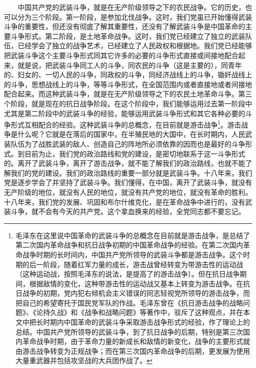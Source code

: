 \documentclass[cn,11pt,chinese]{elegantbook}
\begin{document}
　　中国共产党的武装斗争，就是在无产阶级领导之下的农民战争。它的历史，也可以分为三个阶段。第一阶段，是参加北伐战争。这时，我们党虽已开始懂得武装斗争的重要性，但还没有彻底了解其重要性，还没有了解武装斗争是中国革命的主要斗争形式。第二阶段，是土地革命战争。这时，我们党已经建立了独立的武装队伍，已经学会了独立的战争艺术，已经建立了人民政权和根据地。我们党已经能够把武装斗争这个主要斗争形式同其它许多的必要的斗争形式直接或间接地配合起来，就是说，把武装斗争同工人的斗争，同农民的斗争（这是主要的），同青年的、妇女的、一切人民的斗争，同政权的斗争，同经济战线上的斗争，锄奸战线上的斗争，思想战线上的斗争，等等斗争形式，在全国范围内或者直接地或者间接地配合起来。而这种武装斗争，就是在无产阶级领导之下的农民土地革命斗争。第三个阶段，就是现在的抗日战争阶段。在这个阶段中，我们能够运用过去第一阶段中尤其是第二阶段中的武装斗争的经验，能够运用武装斗争形式和其它各种必要的斗争形式互相配合的经验。这种武装斗争的总概念，在目前就是游击战争\footnote[3]{ 毛泽东在这里说中国革命的武装斗争的总概念在目前就是游击战争，是总结了第二次国内革命战争和抗日战争初期的中国革命战争的经验。在第二次国内革命战争时期的长时间内，中国共产党所领导的武装斗争都是游击战争。这个时期的后一阶段，随着红军力量的成长，游击战曾经转变为带游击性的运动战（这种运动战，按照毛泽东的说法，是提高了的游击战争）。但在抗日战争期间，根据敌情的变化，这种带游击性的运动战又基本上转变为游击战争。在抗日战争的初期，党内犯右倾机会主义错误的同志轻视党所领导的游击战争，而把自己的希望寄托于国民党军队的作战。毛泽东曾在《抗日游击战争的战略问题》、《论持久战》和《战争和战略问题》等著作中，驳斥了这种观点，并在本文中把长时期内中国革命的武装斗争采取游击战争形式的经验，作了理论上的总结。中国共产党所领导的武装斗争，到了抗日战争的后期，特别是第三次国内革命战争时期，由于革命力量的新成长和敌情的新变化，战争的主要形式就由游击战争转变为正规战争；而在第三次国内革命战争的后期，更发展为使用大量重武器并包括攻坚战的大兵团作战了。}。游击战争是什么呢？它就是在落后的国家中，在半殖民地的大国中，在长时期内，人民武装队伍为了战胜武装的敌人、创造自己的阵地所必须依靠的因而也是最好的斗争形式。到目前为止，我们党的政治路线和党的建设，是密切地联系于这一斗争形式的。离开了武装斗争，离开了游击战争，就不能了解我们的政治路线，也就不能了解我们的党的建设。我们的政治路线的重要一部分就是武装斗争。十八年来，我们党是逐步学会了并坚持了武装斗争。我们懂得，在中国，离开了武装斗争，就没有无产阶级的地位，就没有人民的地位，就没有共产党的地位，就没有革命的胜利。十八年来，我们党的发展、巩固和布尔什维克化，是在革命战争中进行的，没有武装斗争，就不会有今天的共产党。这个拿血换来的经验，全党同志都不要忘记。\\
\end{document}
